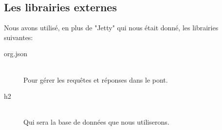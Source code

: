 \documentclass[10pt,a4paper]{report}
\begin{document}
\begin{flushleft}
\section{Les librairies externes}
Nous avons utilisé, en plus de "Jetty" qui nous était donné, les librairies suivantes:\\
\begin{description}
\item[org.json] \hfill \\ Pour gérer les requêtes et réponses dans le pont.
\item[h2] \hfill \\ Qui sera la base de données que nous utiliserons.
\end{description}
\end{flushleft}
\end{document}
